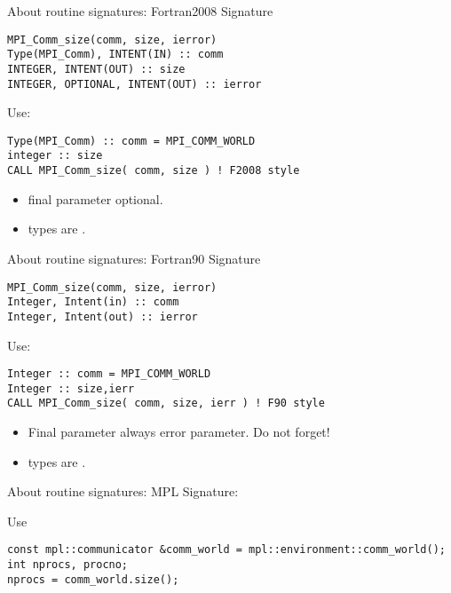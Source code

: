 \begin{fortran}
  \addtocounter{slidecount}{-1}
\begin{numberedframe}{About routine signatures: Fortran2008}
Signature
\lstset{language=Fortran}
\begin{lstlisting}
MPI_Comm_size(comm, size, ierror)
Type(MPI_Comm), INTENT(IN) :: comm
INTEGER, INTENT(OUT) :: size
INTEGER, OPTIONAL, INTENT(OUT) :: ierror
\end{lstlisting}
Use:
\begin{lstlisting}
Type(MPI_Comm) :: comm = MPI_COMM_WORLD
integer :: size
CALL MPI_Comm_size( comm, size ) ! F2008 style
\end{lstlisting}
\begin{itemize}
\item final parameter optional.
\item {} types are .
\end{itemize}
\end{numberedframe}

\begin{numberedframe}[f]{About routine signatures: Fortran90}
Signature
\lstset{language=Fortran}
\begin{lstlisting}
MPI_Comm_size(comm, size, ierror)
Integer, Intent(in) :: comm
Integer, Intent(out) :: ierror
\end{lstlisting}
Use:
\begin{lstlisting}
Integer :: comm = MPI_COMM_WORLD
Integer :: size,ierr
CALL MPI_Comm_size( comm, size, ierr ) ! F90 style
\end{lstlisting}
\begin{itemize}
\item Final parameter always error parameter. Do not forget!
\item {} types are .
\end{itemize}
\end{numberedframe}
\end{fortran}

\begin{mpl}
  \addtocounter{slidecount}{-1}
\begin{numberedframe}{About routine signatures: MPL}
  Signature:
  
  Use
\begin{lstlisting}
const mpl::communicator &comm_world = mpl::environment::comm_world();
int nprocs, procno;
nprocs = comm_world.size();
\end{lstlisting}
\end{numberedframe}
\end{mpl}

